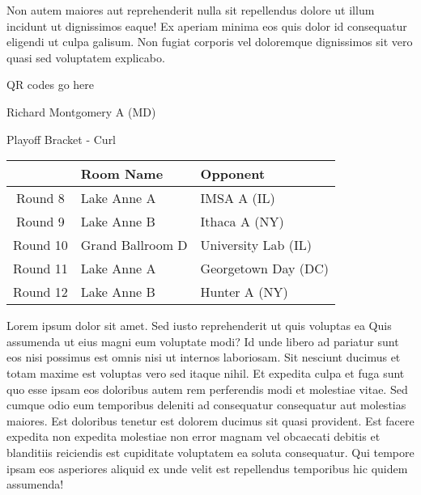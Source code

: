\documentclass{article}%
\begin{document}
\newline%
Non autem maiores aut reprehenderit nulla sit repellendus dolore ut illum incidunt ut dignissimos eaque! Ex aperiam minima eos quis dolor id consequatur eligendi ut culpa galisum. Non fugiat corporis vel doloremque dignissimos sit vero quasi sed voluptatem explicabo.\newline%
\newline%
%
\vspace*{30pt}%
\begin{center}%
\begin{Huge}%
QR codes go here%
\end{Huge}%
\end{center}%
\newpage%
\begin{center}%
\begin{Huge}%
Richard Montgomery A (MD)%
\end{Huge}%
\vspace*{8pt}%
\linebreak%
\begin{Large}%
Playoff Bracket {-} Curl%
\end{Large}%
\end{center}%
%
\begin{tabularx}{\textwidth}{|c|Y|Y|}%
\hline%
&Room Name&Opponent\\%
\hline%
Round 8&Lake Anne A&IMSA A (IL)\\%
Round 9&Lake Anne B&Ithaca A (NY)\\%
Round 10&Grand Ballroom D&University Lab (IL)\\%
Round 11&Lake Anne A&Georgetown Day (DC)\\%
Round 12&Lake Anne B&Hunter A (NY)\\%
\hline%
\end{tabularx}%
\vspace*{8pt}%
\linebreak%
\newline%
\newline%
Lorem ipsum dolor sit amet. Sed iusto reprehenderit ut quis voluptas ea Quis assumenda ut eius magni eum voluptate modi? Id unde libero ad pariatur sunt eos nisi possimus est omnis nisi ut internos laboriosam. Sit nesciunt ducimus et totam maxime est voluptas vero sed itaque nihil. Et expedita culpa et fuga sunt quo esse ipsam eos doloribus autem rem perferendis modi et molestiae vitae.\newline%
\newline%
Sed cumque odio eum temporibus deleniti ad consequatur consequatur aut molestias maiores. Est doloribus tenetur est dolorem ducimus sit quasi provident. Est facere expedita non expedita molestiae non error magnam vel obcaecati debitis et blanditiis reiciendis est cupiditate voluptatem ea soluta consequatur. Qui tempore ipsam eos asperiores aliquid ex unde velit est repellendus temporibus hic quidem assumenda!\newline%
\end{document}
